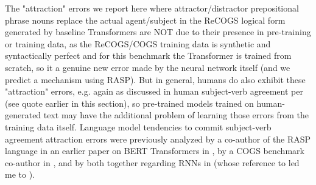 \documentclass[11pt]{article}
\begin{document}
The "attraction" errors we report here where attractor/distractor prepositional phrase nouns replace the actual agent/subject in the ReCOGS logical form generated by \cite{Wu2023} baseline Transformers are NOT due to their presence in pre-training or training data, as the ReCOGS/COGS training data is synthetic and syntactically perfect and for this benchmark the Transformer is trained from scratch, so it a genuine new error made by the neural network itself (and we predict a mechanism using RASP). But in general, humans do also exhibit these "attraction" errors, e.g. again as discussed in human subject-verb agreement per \cite{jespersen1913modernenglishgrammar1954reprint} (see quote earlier in this section), so pre-trained models trained on human-generated text may have the additional problem of learning those errors from the training data itself. Language model tendencies to commit subject-verb agreement attraction errors were previously analyzed by a co-author of the RASP language in an earlier paper on BERT Transformers in \cite{goldberg2019assessingbertssyntacticabilities}, by a COGS benchmark co-author in \cite{vanschijndel2019quantitydoesntbuyquality}, and by both together regarding RNNs in \cite{linzen2016assessing} (whose reference to \cite{agreementwithnearestlanguagelog} led me to \cite{jespersen1913modernenglishgrammar1954reprint}).
\end{document}
